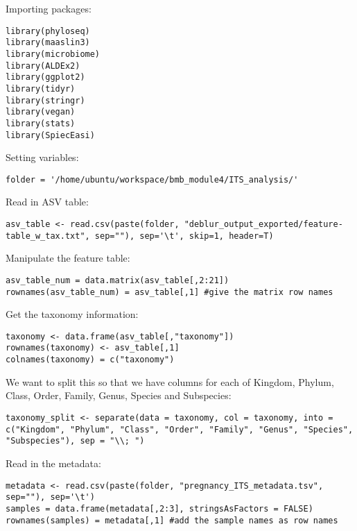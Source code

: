 \documentclass[
]{book}
\begin{document}
Importing packages:

\begin{verbatim}
library(phyloseq)
library(maaslin3)
library(microbiome)
library(ALDEx2)
library(ggplot2)
library(tidyr)
library(stringr)
library(vegan)
library(stats)
library(SpiecEasi)
\end{verbatim}

Setting variables:

\begin{verbatim}
folder = '/home/ubuntu/workspace/bmb_module4/ITS_analysis/'
\end{verbatim}

Read in ASV table:

\begin{verbatim}
asv_table <- read.csv(paste(folder, "deblur_output_exported/feature-table_w_tax.txt", sep=""), sep='\t', skip=1, header=T)
\end{verbatim}

Manipulate the feature table:

\begin{verbatim}
asv_table_num = data.matrix(asv_table[,2:21]) 
rownames(asv_table_num) = asv_table[,1] #give the matrix row names
\end{verbatim}

Get the taxonomy information:

\begin{verbatim}
taxonomy <- data.frame(asv_table[,"taxonomy"])
rownames(taxonomy) <- asv_table[,1]
colnames(taxonomy) = c("taxonomy")
\end{verbatim}

We want to split this so that we have columns for each of Kingdom, Phylum, Class, Order, Family, Genus, Species and Subspecies:

\begin{verbatim}
taxonomy_split <- separate(data = taxonomy, col = taxonomy, into = c("Kingdom", "Phylum", "Class", "Order", "Family", "Genus", "Species", "Subspecies"), sep = "\\; ")
\end{verbatim}

Read in the metadata:

\begin{verbatim}
metadata <- read.csv(paste(folder, "pregnancy_ITS_metadata.tsv", sep=""), sep='\t')
samples = data.frame(metadata[,2:3], stringsAsFactors = FALSE)
rownames(samples) = metadata[,1] #add the sample names as row names
\end{verbatim}
\end{document}

